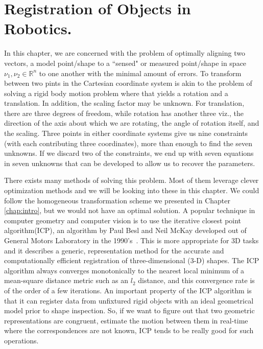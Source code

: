 \chapter{Registration of Objects in Robotics.}  
 \label{chap:opt_rot::intro}
 
 In this chapter, we are concerned with the problem of optimally aligning two vectors, a model point/shape to a ``sensed" or measured point/shape in space \eg $\nu_1, \nu_2 \in \mathbb{R}^n$ to one another with the minimal amount of errors.
 To transform between two pints in the Cartesian coordinate system is akin to the problem of solving a rigid body motion problem where that yields a rotation and a translation. In addition, the scaling factor may be unknown. For translation, there are three degrees of freedom, while rotation has another three viz., the direction of the axis about which we are rotating,  the angle of rotation itself, and the scaling. Three points in either coordinate systems give us nine constraints (with each contributing three coordinates), more than enough to find the seven unknowns. If we discard two of the constraints, we end up with seven equations in seven unknowns that can be developed to allow us to recover the parameters.
 
 There exists many methods of solving this problem. Most of them leverage clever optimization methods and we will be looking into these in this chapter. We could follow the homogeneous transformation scheme we presented in Chapter \ref{chap:intro}, but we would not have an optimal solution. A popular technique in computer geometry and computer vision is to use the iterative closest point algorithm(ICP), an algorithm by Paul Besl and Neil McKay developed out of General Motors Laboratory in the 1990's~\cite{besl1992method}. This is more appropriate for 3D tasks and it describes a generic, representation method for the accurate and computationally efficient registration of three-dimensional (3-D) shapes. The ICP algorithm always converges monotonically to the nearest local minimum of a mean-square distance metric such as an $l_2$ distance, and this convergence rate is of the order of a few iterations. An important property of the ICP algorithm is that it can register data from unfixtured rigid objects with an ideal geometrical model prior to shape inspection. So, if we want to figure out that two geometric representations are congruent, estimate the motion between them in real-time where the correspondences are not known, ICP tends to be really good for such operations.
 
